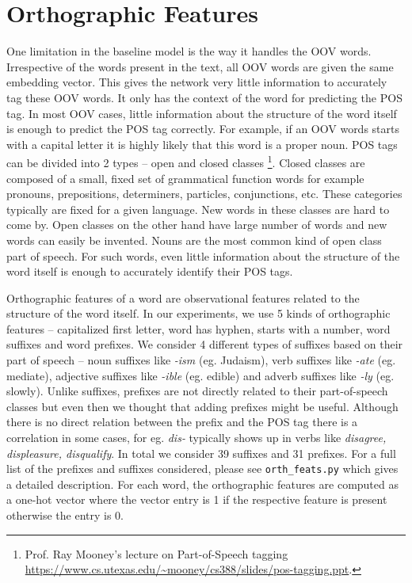 \documentclass[11pt,letterpaper]{article}
\newcommand{\code}[1]{\texttt{#1}}
\begin{document}
\section{Orthographic Features}
One limitation in the baseline model is the way it handles the OOV words. Irrespective of the words present in the text, all OOV words are given the same embedding vector. This gives the network very little information to accurately tag these OOV words. It only has the context of the word for predicting the POS tag. In most OOV cases, little information about the structure of the word itself is enough to predict the POS tag correctly. For example, if an OOV words starts with a capital letter it is highly likely that this word is a proper noun. POS tags can be divided into 2 types -- open and closed classes \footnote{Prof. Ray Mooney's lecture on Part-of-Speech tagging \url{https://www.cs.utexas.edu/~mooney/cs388/slides/pos-tagging.ppt}.}. Closed classes are composed of a small, fixed set of grammatical function words for example pronouns, prepositions, determiners, particles, conjunctions, etc. These categories typically are fixed for a given language. New words in these classes are hard to come by. Open classes on the other hand have large number of words and new words can easily be invented. Nouns are the most common kind of open class part of speech. For such words, even little information about the structure of the word itself is enough to accurately identify their POS tags.

Orthographic features of a word are observational features related to the structure of the word itself. In our experiments, we use 5 kinds of orthographic features -- capitalized first letter, word has hyphen, starts with a number, word suffixes and word prefixes. We consider 4 different types of suffixes based on their part of speech -- noun suffixes like \emph{-ism} (eg. Judaism), verb suffixes like \emph{-ate} (eg. mediate), adjective suffixes like \emph{-ible} (eg. edible) and adverb suffixes like \emph{-ly} (eg. slowly). Unlike suffixes, prefixes are not directly related to their part-of-speech classes but even then we thought that adding prefixes might be useful. Although there is no direct relation between the prefix and the POS tag there is a correlation in some cases, for eg. \emph{dis-} typically shows up in verbs like \emph{disagree, displeasure, disqualify}. In total we consider 39 suffixes and 31 prefixes. For a full list of the prefixes and suffixes considered, please see \code{orth\_feats.py} which gives a detailed description. For each word, the orthographic features are computed as a one-hot vector where the vector entry is 1 if the respective feature is present otherwise the entry is 0.
\end{document}
